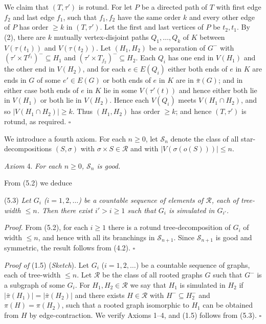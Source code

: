 We claim that $(T, \tau')$ is rotund. For let $P$ be a directed path of $T$ with first edge $f_2$ and last edge $f_1$, such that $f_1, f_2$ have the same order $k$ and every other edge of $P$ has order $\ge k$ in $(T, \tau')$. Let the first and last vertices of $P$ be $t_2, t_1$. By (2), there are $k$ mutually vertex-disjoint paths $Q_1, \dots, Q_k$ of $K$ between $V(\tau(t_1))$ and $V(\tau(t_2))$. Let $(H_1, H_2)$ be a separation of $G^-$ with $(\tau' \times T^{f_1})^- \subseteq H_1$ and $(\tau' \times T_{f_2})^- \subseteq H_2$. Each $Q_i$ has one end in $V(H_1)$ and the other end in $V(H_2)$, and for each $e \in E(Q_i)$ either both ends of $e$ in $K$ are ends in $G$ of some $e' \in E(G)$ or both ends of $e$ in $K$ are in $\bar{\pi}(G)$; and in either case both ends of $e$ in $K$ lie in some $V(\tau'(t))$ and hence either both lie in $V(H_1)$ or both lie in $V(H_2)$. Hence each $V(Q_i)$ meets $V(H_1 \cap H_2)$, and so $|V(H_1 \cap H_2)| \ge k$. Thus $(H_1, H_2)$ has order $\ge k$; and hence $(T, \tau')$ is rotund, as required. $\square$

We introduce a fourth axiom. For each $n \ge 0$, let $\mathscr{S}_n$ denote the class of all star-decompositions $(S, \sigma)$ with $\sigma \times S \in \mathscr{R}$ and with $|V(\sigma(o(S)))| \le n$.

\textit{Axiom} 4. \textit{For each $n \ge 0$, $\mathscr{S}_n$ is good.}

From (5.2) we deduce

\stmt
(5.3) \textit{Let $G_i$ ($i = 1, 2, \dots$) be a countable sequence of elements of $\mathscr{R}$, each of tree-width $\le n$. Then there exist $i' > i \ge 1$ such that $G_i$ is simulated in $G_{i'}$.}

\textit{Proof.} From (5.2), for each $i \ge 1$ there is a rotund tree-decomposition of $G_i$ of width $\le n$, and hence with all its branchings in $\mathscr{S}_{n + 1}$. Since $\mathscr{S}_{n + 1}$ is good and symmetric, the result follows from (4.2). $\square$

\textit{Proof of} (1.5) (\textit{Sketch}). Let $G_i$ ($i = 1, 2, \dots$) be a countable sequence of graphs, each of tree-width $\le n$. Let $\mathscr{R}$ be the class of all rooted graphs $G$ such that $G^-$ is a subgraph of some $G_i$. For $H_1, H_2 \in \mathscr{R}$ we say that $H_1$ is simulated in $H_2$ if $|\bar{\pi}(H_1)| = |\bar{\pi}(H_2)|$ and there exists $H \in \mathscr{R}$ with $H^- \subseteq H_2^-$ and $\pi(H) = \pi(H_2)$, such that a rooted graph isomorphic to $H_1$ can be obtained from $H$ by edge-contraction. We verify Axioms 1--4, and (1.5) follows from (5.3). $\square$

